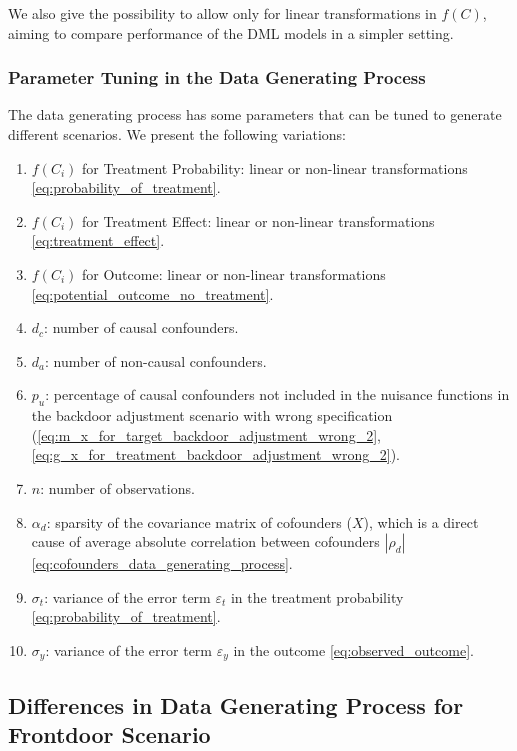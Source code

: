 \documentclass{article}
\numberwithin{equation}{section}
\begin{document}
We also give the possibility to allow only for linear transformations in $f(C)$, aiming to compare performance of the DML models in a simpler setting.

\subsubsection{Parameter Tuning in the Data Generating Process}
\label{subsubsec:parameter_tuning_in_the_data_generating_process_backdoor}

The data generating process has some parameters that can be tuned to generate different scenarios. We present the following variations:

\begin{enumerate}[label=\roman*.]
    \item $f(C_i)$ for Treatment Probability: linear or non-linear transformations \eqref{eq:probability_of_treatment}.
    \item $f(C_i)$ for Treatment Effect: linear or non-linear transformations \eqref{eq:treatment_effect}.
    \item $f(C_i)$ for Outcome: linear or non-linear transformations \eqref{eq:potential_outcome_no_treatment}.
    \item $d_c$: number of causal confounders.
    \item $d_a$: number of non-causal confounders.
    \item $p_u$: percentage of causal confounders not included in the nuisance functions in the backdoor adjustment scenario with wrong specification (\ref{eq:m_x_for_target_backdoor_adjustment_wrong_2}, \ref{eq:g_x_for_treatment_backdoor_adjustment_wrong_2}).
    \item $n$: number of observations.
    \item $\alpha_d$: sparsity of the covariance matrix of cofounders ($X$), which is a direct cause of average absolute correlation between cofounders ${|\rho_d|}$ \eqref{eq:cofounders_data_generating_process}.
    \item $\sigma_t$: variance of the error term $\varepsilon_t$ in the treatment probability \eqref{eq:probability_of_treatment}.
    \item $\sigma_y$: variance of the error term $\varepsilon_y$ in the outcome \eqref{eq:observed_outcome}.
\end{enumerate}

\subsection{Differences in Data Generating Process for Frontdoor Scenario}
\label{subsec:differences_in_data_generating_process_for_frontdoor_scenario}
\end{document}
